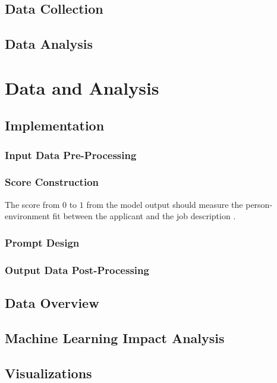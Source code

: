 \documentclass[draft,final]{thesisclass} %
\begin{document}
\section{Data Collection}
\lipsum[1]

\section{Data Analysis}
\lipsum[1]

\chapter{Data and Analysis}

\section{Implementation} \label{implementation}


\subsection{Input Data Pre-Processing}
\lipsum[1]

\subsection{Score Construction}
The score from $0$ to $1$ from the model output should measure the person-environment fit between the applicant and the job description \cite[1]{po_and_pj_fit_literature_review}.

\subsection{Prompt Design}
\lipsum[1]

\subsection{Output Data Post-Processing}
\lipsum[1]

\section{Data Overview}
\lipsum[1]

\section{Machine Learning Impact Analysis}
\lipsum[1]

\section{Visualizations}
\lipsum[1]
\end{document}
